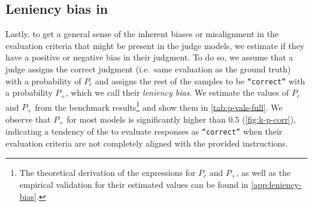 \subsection{Leniency bias in \judgemodels}
\label{sec:leniency-bias}

    

Lastly, to get a general sense of the inherent biases or misalignment in the evaluation criteria that might be present in the judge models, we estimate if they have a positive or negative bias in their judgment.
To do so, we assume that a judge assigns the correct judgment (i.e.\ same evaluation as the ground truth) with a probability of $P_c$ and assigns the rest of the samples to be \texttt{``correct''} with a probability $P_+$, which we call their \textit{leniency bias}.
We estimate the values of $P_c$ and $P_+$ from the benchmark results\footnote{
The theoretical derivation of the expressions for $P_c$ and $P_+$, as well as the empirical validation for their estimated values can be found in \cref{app:leniency-bias}.}
and show them in \cref{tab:p-vals-full}. 
We observe that $P_+$ for most models is significantly higher than $0.5$ (\cref{fig:k-p-corr}), indicating a tendency of the \judgemodels to evaluate responses as \texttt{``correct''} when their evaluation criteria are not completely aligned with the provided instructions. 
